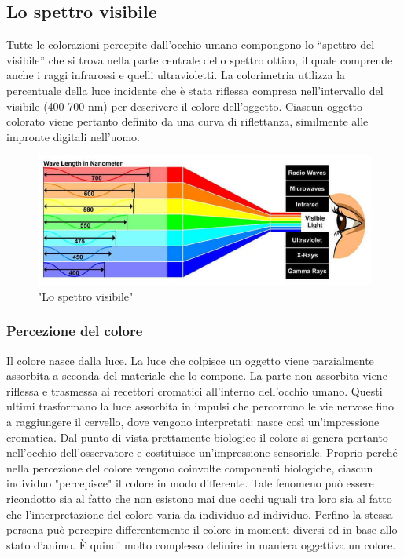 \documentclass[a4paper,11pt]{article}
\begin{document}
        \subsection{Lo spettro visibile}
        Tutte le colorazioni percepite dall’occhio umano compongono lo “spettro del visibile” che si trova nella parte centrale dello spettro ottico, il quale
        comprende anche i raggi infrarossi e quelli ultravioletti. 
        La colorimetria utilizza la percentuale della luce incidente che è stata riflessa compresa
        nell'intervallo del visibile (400-700 nm) per descrivere il colore dell'oggetto. Ciascun oggetto
        colorato viene pertanto definito da una curva di riflettanza, similmente alle impronte digitali
        nell’uomo. 
        \begin{figure}[h]
            \centering
            \includegraphics[scale=0.45]{colorimetria3}
            \caption{"Lo spettro visibile"}
        \end{figure}
        \newpage
        \subsubsection{Percezione del colore}
        Il colore nasce dalla luce. La luce che colpisce un oggetto viene parzialmente assorbita a
        seconda del materiale che lo compone. La parte non assorbita viene riflessa e trasmessa ai recettori cromatici
        all’interno dell’occhio umano. Questi ultimi trasformano la luce assorbita in impulsi che
        percorrono le vie nervose fino a raggiungere il cervello, dove vengono interpretati: nasce così
        un’impressione cromatica. Dal punto di vista prettamente biologico il colore si genera pertanto
        nell’occhio dell’osservatore e costituisce un’impressione sensoriale.
        Proprio perché nella percezione del colore vengono coinvolte componenti biologiche, ciascun individuo "percepisce" il colore in modo
        differente. Tale fenomeno può essere ricondotto sia al fatto che non esistono mai due occhi
        uguali tra loro sia al fatto che l’interpretazione del colore varia da individuo ad individuo.
        Perfino la stessa persona può percepire differentemente il colore in momenti diversi ed in base
        allo stato d’animo. È quindi molto complesso definire in maniera oggettiva un colore.
\end{document}

